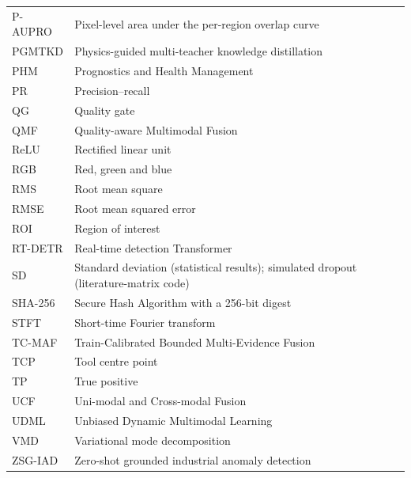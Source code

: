 \begin{longtable}{@{}P{.20\textwidth}P{.74\textwidth}@{}}
P-AUPRO & Pixel-level area under the per-region overlap curve \\
PGMTKD & Physics-guided multi-teacher knowledge distillation \\
PHM & Prognostics and Health Management \\
PR & Precision--recall \\
QG & Quality gate \\
QMF & Quality-aware Multimodal Fusion \\
ReLU & Rectified linear unit \\
RGB & Red, green and blue \\
RMS & Root mean square \\
RMSE & Root mean squared error \\
ROI & Region of interest \\
RT-DETR & Real-time detection Transformer \\
SD & Standard deviation (statistical results); simulated dropout (literature-matrix code) \\
SHA-256 & Secure Hash Algorithm with a 256-bit digest \\
STFT & Short-time Fourier transform \\
TC-MAF & Train-Calibrated Bounded Multi-Evidence Fusion \\
TCP & Tool centre point \\
TP & True positive \\
UCF & Uni-modal and Cross-modal Fusion \\
UDML & Unbiased Dynamic Multimodal Learning \\
VMD & Variational mode decomposition \\
ZSG-IAD & Zero-shot grounded industrial anomaly detection \\
\end{longtable}
\endgroup
